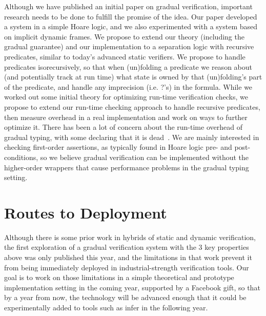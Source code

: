 \documentclass[10pt,twocolumn]{article}
\begin{document}
\begin{sloppypar}
Although we have published an initial paper on gradual verification, important research needs to be done to fulfill the promise of the idea.  Our paper developed a system in a simple Hoare logic, and we also experimented with a system based on implicit dynamic frames.  We propose to extend our theory (including the gradual guarantee) and our implementation to a separation logic with recursive predicates, similar to today's advanced static verifiers.  We propose to handle predicates isorecursively, so that when (un)folding a predicate we reason about (and potentially track at run time) what state is owned by that (un)folding's part of the predicate, and handle any imprecision (i.e. ?'s) in the formula. While we worked out some initial theory for optimizing run-time verification checks, we propose to extend our run-time checking approach to handle recursive predicates, then measure overhead in a real implementation and work on ways to further optimize it.  There has been a lot of concern about the run-time overhead of gradual typing, with some declaring that it is dead~\cite{Takikawa:2016:SGT:2837614.2837630}.  We are mainly interested in checking first-order assertions, as typically found in Hoare logic pre- and post-conditions, so we believe gradual verification can be implemented without the higher-order wrappers that cause performance problems in the gradual typing setting.

\section{Routes to Deployment}

Although there is some prior work in hybrids of static and dynamic verification, the first exploration of a gradual verification system with the 3 key properties above was only published this year, and the limitations in that work prevent it from being immediately deployed in industrial-strength verification tools.  Our goal is to work on those limitations in a simple theoretical and prototype implementation setting in the coming year, supported by a Facebook gift, so that by a year from now, the technology will be advanced enough that it could be experimentally added to tools such as infer in the following year.


\end{sloppypar}
\end{document}
